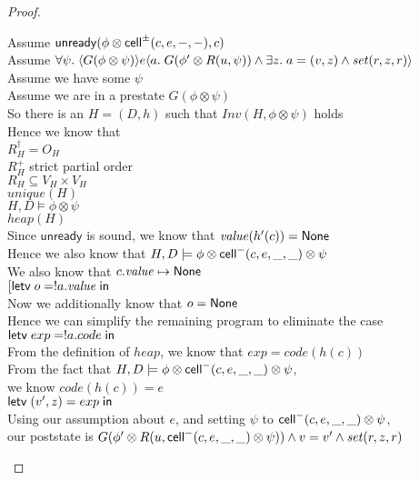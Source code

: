 \begin{proof}
\begin{tabbedproof}
\oo Assume $\mathsf{unready}({\phi \otimes \mathsf{cell}^{\pm}({c}, {e}, {-}, {-})}, {c})$ \\
\oo Assume $\forall \psi.\; 
       \langle{G(\phi \otimes \psi)}\rangle{e}\langle{a}.\;{G(\phi' \otimes R(u, \psi)) \land \exists z.\; a = (v, z) \land \mathit{set}(r, z, r)}\rangle $ \\
\oo Assume we have some $\psi$ \\
\ooo Assume we are in a prestate $G(\phi \otimes \psi)$ \\
\ooo So there is an $H = (D,h)$ such that $\mathit{Inv}(H, \phi \otimes \psi)$ holds \\
\ooo Hence we know that \\
\ooox $R^\dagger_H = O_H$ \\
\ooox $R^+_H$ strict partial order \\
\ooox $R_H \subseteq V_H \times V_H$ \\
\ooox $\mathit{unique}(H)$ \\
\ooox $H, D \models \phi \otimes \psi$ \\
\ooox $\mathit{heap}(H)$ \\
\ooo Since $\mathsf{unready}$ is sound, we know that $\mathit{value}(h'(c)) = \mathsf{None}$ \\
\ooo Hence we also know that $H, D \models \phi \otimes \mathsf{cell}^{-}({c}, {e}, {\_}, {\_}) \otimes \psi$ \\
\ooo We also know that $c.\mathit{value} \mapsto \mathsf{None}$ \\
\ooo $[\mathsf{letv}\;o = !a.\mathit{value}\;\mathsf{in}\;$ \\
\ooo Now we additionally know that $o = \mathsf{None}$ \\
\ooo Hence we can simplify the remaining program to eliminate the case \\
\ooo $\mathsf{letv}\;exp = !a.code\;\mathsf{in}\;$ \\
\ooo From the definition of $\mathit{heap}$, we know that $exp = \mathit{code}(h(c))$ \\
\ooo From the fact that $H, D \models \phi \otimes \mathsf{cell}^{-}({c}, {e}, {\_}, {\_}) \otimes \psi$, \\
\oox we know $\mathit{code}(h(c)) = e$ \\
\ooo $\mathsf{letv}\;(v',z) = exp\;\mathsf{in}\;$ \\
\ooo Using our assumption about $e$, and setting $\psi$ to $\mathsf{cell}^{-}({c}, {e}, {\_}, {\_}) \otimes \psi$, \\
\ooo our poststate is $G(\phi' \otimes R(u, \mathsf{cell}^{-}({c}, {e}, {\_}, {\_}) \otimes \psi)) \land v = v' \land \mathit{set}(r, z, r)$ \\

\end{tabbedproof}
\end{proof}
